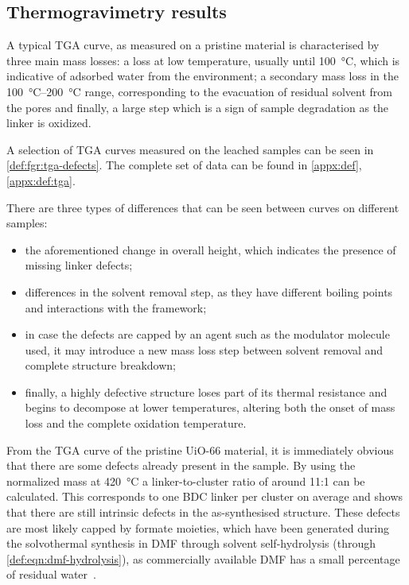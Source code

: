 
\subsection{Thermogravimetry results}

A typical TGA curve, as measured on a pristine material
is characterised by three main mass losses: a loss
at low temperature, usually until \SI{100}{\degreeCelsius},
which is indicative of adsorbed water from the environment;
a secondary mass loss in the \SIrange{100}{200}{\degreeCelsius}
range, corresponding to the evacuation of residual solvent 
from the pores and finally, a large step which is a sign of 
sample degradation as the linker is oxidized.

A selection of TGA curves measured on the leached samples
can be seen in \autoref{def:fgr:tga-defects}. The complete set of data
can be found in \autoref{appx:def}, \autoref{appx:def:tga}.

There are three types of differences that can be seen 
between curves on different samples:

\begin{itemize}
    \item the aforementioned change in overall height,
    which indicates the presence of missing linker defects;
    \item differences in the solvent removal step, as they
    have different boiling points and interactions with the 
    framework;
    \item in case the defects are capped by an agent such as 
    the modulator molecule used, it may introduce a new 
    mass loss step between solvent removal and complete
    structure breakdown;
    \item finally, a highly defective structure loses part 
    of its thermal resistance and begins to decompose 
    at lower temperatures, altering both the onset of mass
    loss and the complete oxidation temperature.
\end{itemize}

From the TGA curve of the pristine UiO-66 material, 
it is immediately obvious that there are some defects 
already present in the sample. By using the normalized
mass at \SI{420}{\degreeCelsius} a linker-to-cluster 
ratio of around 11:1 can be calculated. This corresponds 
to one BDC linker per cluster on average and shows that
there are still intrinsic defects in the as-synthesised 
structure. These defects are most likely capped by 
formate moieties, which have been generated during 
the solvothermal synthesis in DMF through solvent 
self-hydrolysis (through \autoref{def:eqn:dmf-hydrolysis}), as 
commercially available DMF has a small percentage of 
residual water~\cite{shearerDefectEngineeringTuning2016}.

